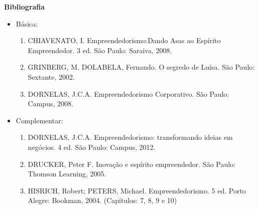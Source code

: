 


\begin{snugshade}\begin{center}\textbf{
    Bibliografia
}\end{center}\end{snugshade}

\begin{itemize} 

\item Básica:

    \begin{enumerate}

    \item CHIAVENATO, I. Empreendedorismo:Dando Asas ao Espírito 		Empreendedor. 3 ed. São Paulo: Saraiva, 2008.

    \item GRINBERG, M.
		DOLABELA, Fernando. O segredo de Luísa. São Paulo: Sextante, 2002.


    \item DORNELAS, J.C.A. Empreendedorismo Corporativo. São Paulo: Campus, 		2008.

    \end{enumerate}

\item Complementar:
	\begin{enumerate} 

    \item DORNELAS, J.C.A. Empreendedorismo: transformando ideias em 		negócios. 4 ed. São Paulo: Campus, 2012.


    \item DRUCKER, Peter F. Inovação e espírito empreendedor. São Paulo: 		Thomson Learning, 2005.

    \item HISRICH, Robert; PETERS, Michael. Empreendedorismo. 5 ed. Porto 		Alegre: Bookman, 2004. (Capítulos: 7, 8, 9 e 10)
	\end{enumerate}

\end{itemize}



